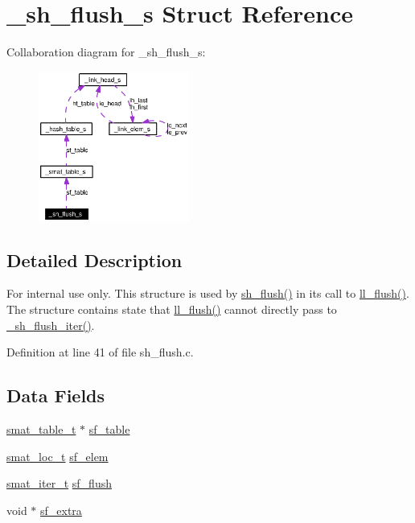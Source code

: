 \hypertarget{struct__sh__flush__s}{
\section{\_\-sh\_\-flush\_\-s Struct Reference}
\label{struct__sh__flush__s}
}
Collaboration diagram for \_\-sh\_\-flush\_\-s:\begin{figure}[H]
\begin{center}
\leavevmode
\includegraphics[width=140pt]{struct__sh__flush__s__coll__graph}
\end{center}
\end{figure}


\subsection{Detailed Description}
\begin{Desc}
\item[For internal use only.]
This structure is used by \hyperlink{dbprim_8h_a178}{sh\_\-flush()} in its call to \hyperlink{group__dbprim__link_ga11}{ll\_\-flush()}. The structure contains state that \hyperlink{group__dbprim__link_ga11}{ll\_\-flush()} cannot directly pass to \hyperlink{group__dbprim__smat_ga28}{\_\-sh\_\-flush\_\-iter()}.\end{Desc}




Definition at line 41 of file sh\_\-flush.c.\subsection*{Data Fields}
\begin{CompactItemize}
\item 
\hyperlink{struct__smat__table__s}{smat\_\-table\_\-t} $\ast$ \hyperlink{struct__sh__flush__s_o0}{sf\_\-table}
\item 
\hyperlink{group__dbprim__smat_ga6}{smat\_\-loc\_\-t} \hyperlink{struct__sh__flush__s_o1}{sf\_\-elem}
\item 
\hyperlink{group__dbprim__smat_ga4}{smat\_\-iter\_\-t} \hyperlink{struct__sh__flush__s_o2}{sf\_\-flush}
\item 
void $\ast$ \hyperlink{struct__sh__flush__s_o3}{sf\_\-extra}
\end{CompactItemize}


